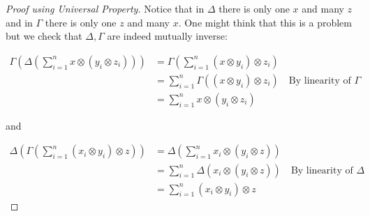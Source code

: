 \documentclass[11pt]{article}
\theoremstyle{definition}
\theoremstyle{plain}
\theoremstyle{plain}
\theoremstyle{plain}
\theoremstyle{definition}
\begin{document}
\begin{proof}[Proof using Universal Property]
Notice that in $\Delta$ there is only one $x$ and many $z$ and in $\Gamma$ there is only one $z$ and many $x$. One might think that this is a problem but we check that $\Delta, \Gamma$ are indeed mutually inverse:

\begin{align*}
\Gamma(\Delta(\sum\limits_{i=1}^{n}x \otimes (y_i \otimes z_i))) &= \Gamma(\sum\limits_{i=1}^{n}(x \otimes y_i) \otimes z_i) \\
&= \sum\limits_{i=1}^{n}\Gamma((x \otimes y_i) \otimes z_i) \quad \text{By linearity of $\Gamma$} \\
&= \sum\limits_{i=1}^{n}x \otimes (y_i \otimes z_i)
\end{align*}

and

\begin{align*}
\Delta(\Gamma(\sum\limits_{i=1}^{n}(x_i \otimes y_i) \otimes z)) &= \Delta(\sum\limits_{i=1}^{n}x_i \otimes (y_i \otimes z)) \\
&= \sum\limits_{i=1}^{n}\Delta(x_i \otimes (y_i \otimes z)) \quad \text{By linearity of $\Delta$} \\
&= \sum\limits_{i=1}^{n}(x_i \otimes y_i) \otimes z
\end{align*}
\end{proof}
\end{document}
